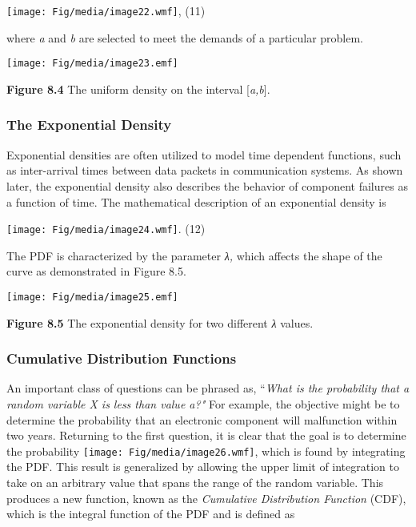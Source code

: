 \texttt{[image: Fig/media/image22.wmf]}, (11)

where \emph{a} and \emph{b} are selected to meet the demands of a
particular problem.

\texttt{[image: Fig/media/image23.emf]}

\textbf{Figure 8.4} The uniform density on the interval
{[}\emph{a,b}{]}.

\subsubsection*{The Exponential Density}\label{the-exponential-density}

Exponential densities are often utilized to model time dependent
functions, such as inter-arrival times between data packets in
communication systems. As shown later, the exponential density also
describes the behavior of component failures as a function of time. The
mathematical description of an exponential density is

\texttt{[image: Fig/media/image24.wmf]}. (12)

The PDF is characterized by the parameter \emph{λ,} which affects the
shape of the curve as demonstrated in Figure 8.5.

\texttt{[image: Fig/media/image25.emf]}

\textbf{Figure 8.5} The exponential density for two different \emph{λ}
values.

\subsubsection{Cumulative Distribution
Functions}\label{cumulative-distribution-functions}

An important class of questions can be phrased as, ``\emph{What is the
probability that a random variable X is less than value a?"} For
example, the objective might be to determine the probability that an
electronic component will malfunction within two years. Returning to the
first question, it is clear that the goal is to determine the
probability \texttt{[image: Fig/media/image26.wmf]}, which is found by
integrating the PDF. This result is generalized by allowing the upper
limit of integration to take on an arbitrary value that spans the range
of the random variable. This produces a new function, known as the
\emph{Cumulative Distribution Function} (CDF), which is the integral
function of the PDF and is defined as

